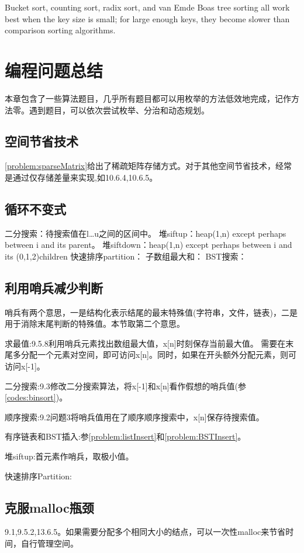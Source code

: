 Bucket sort, counting sort, radix sort, and van Emde Boas tree sorting all work best when the key size is small; for large enough keys, they become slower than comparison sorting algorithms. 






\section{编程问题总结}

本章包含了一些算法题目，几乎所有题目都可以用枚举的方法低效地完成，记作方法零。遇到题目，可以依次尝试枚举、分治和动态规划。

\subsection{空间节省技术}
\ref{problem:sparseMatrix}给出了稀疏矩阵存储方式。对于其他空间节省技术，经常是通过仅存储差量来实现,如\cite{pp}10.6.4,10.6.5。

\subsection{循环不变式}
二分搜索：待搜索值在l\dots u之间的区间中。
堆siftup：heap(1,n) except perhaps between i and its parent。
堆siftdown：heap(1,n) except perhaps between i and its (0,1,2)children
快速排序partition：
子数组最大和：
BST搜索：

\subsection{利用哨兵减少判断}
哨兵有两个意思\cite{wikipedia}，一是结构化表示结尾的最末特殊值(字符串，文件，链表)，二是用于消除末尾判断的特殊值。本节取第二个意思。

求最值:\cite{pp}9.5.8利用哨兵元素找出数组最大值，x[n]时刻保存当前最大值。 需要在末尾多分配一个元素对空间，即可访问x[n]。同时，如果在开头额外分配元素，则可访问x[-1]。

二分搜索:\cite{pp}9.3修改二分搜索算法，将x[-1]和x[n]看作假想的哨兵值(参\ref{codes:binsort})。

顺序搜索:\cite{pp}9.2问题3将哨兵值用在了顺序顺序搜索中，x[n]保存待搜索值。

有序链表和BST插入:参\ref{problem:listInsert}和\ref{problem:BSTInsert}。

堆siftup:首元素作哨兵，取极小值。

快速排序Partition:

\subsection{克服malloc瓶颈}
\cite{pp}9.1,9.5.2,13.6.5。如果需要分配多个相同大小的结点，可以一次性malloc来节省时间，自行管理空间。

